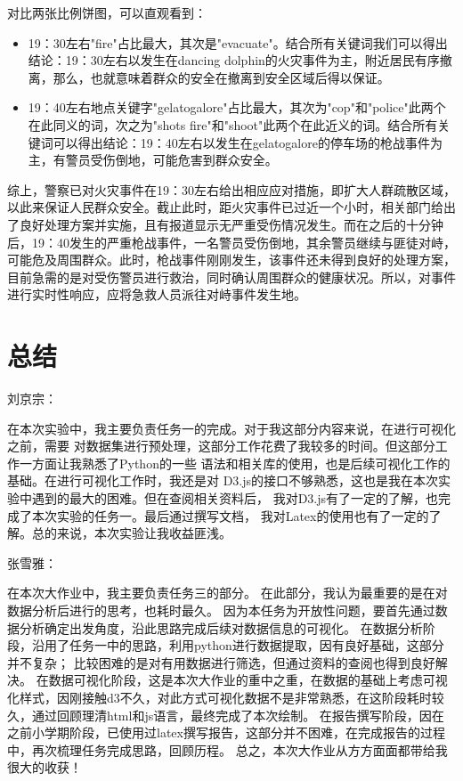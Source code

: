 \documentclass[a4paper]{article}
\begin{document}
对比两张比例饼图，可以直观看到：
\begin{itemize}
    \item 19：30左右"fire"占比最大，其次是"evacuate"。结合所有关键词我们可以得出结论：19：30左右以发生在dancing dolphin的火灾事件为主，附近居民有序撤离，那么，也就意味着群众的安全在撤离到安全区域后得以保证。
    
    \item 19：40左右地点关键字"gelatogalore"占比最大，其次为"cop"和"police"此两个在此同义的词，次之为"shots fire"和"shoot"此两个在此近义的词。结合所有关键词可以得出结论：19：40左右以发生在gelatogalore的停车场的枪战事件为主，有警员受伤倒地，可能危害到群众安全。
\end{itemize}

综上，警察已对火灾事件在19：30左右给出相应应对措施，即扩大人群疏散区域，以此来保证人民群众安全。截止此时，距火灾事件已过近一个小时，相关部门给出了良好处理方案并实施，且有报道显示无严重受伤情况发生。而在之后的十分钟后，19：40发生的严重枪战事件，一名警员受伤倒地，其余警员继续与匪徒对峙，可能危及周围群众。此时，枪战事件刚刚发生，该事件还未得到良好的处理方案，目前急需的是对受伤警员进行救治，同时确认周围群众的健康状况。所以，对事件进行实时性响应，应将急救人员派往对峙事件发生地。


\section{总结}
刘京宗：

在本次实验中，我主要负责任务一的完成。对于我这部分内容来说，在进行可视化之前，需要
对数据集进行预处理，这部分工作花费了我较多的时间。但这部分工作一方面让我熟悉了Python的一些
语法和相关库的使用，也是后续可视化工作的基础。在进行可视化工作时，我还是对
D3.js的接口不够熟悉，这也是我在本次实验中遇到的最大的困难。但在查阅相关资料后，
我对D3.js有了一定的了解，也完成了本次实验的任务一。最后通过撰写文档，
我对Latex的使用也有了一定的了解。总的来说，本次实验让我收益匪浅。

张雪雅：

在本次大作业中，我主要负责任务三的部分。
在此部分，我认为最重要的是在对数据分析后进行的思考，也耗时最久。
因为本任务为开放性问题，要首先通过数据分析确定出发角度，沿此思路完成后续对数据信息的可视化。
在数据分析阶段，沿用了任务一中的思路，利用python进行数据提取，因有良好基础，这部分并不复杂；
比较困难的是对有用数据进行筛选，但通过资料的查阅也得到良好解决。
在数据可视化阶段，这是本次大作业的重中之重，在数据的基础上考虑可视化样式，因刚接触d3不久，对此方式可视化数据不是非常熟悉，在这阶段耗时较久，通过回顾理清html和js语言，最终完成了本次绘制。
在报告撰写阶段，因在之前小学期阶段，已使用过latex撰写报告，这部分并不困难，在完成报告的过程中，再次梳理任务完成思路，回顾历程。
总之，本次大作业从方方面面都带给我很大的收获！
\newpage

\end{document}
